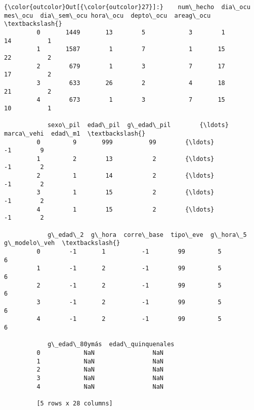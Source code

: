 \documentclass[11pt]{article}
\begin{document}
\begin{Verbatim}[commandchars=\\\{\}]
{\color{outcolor}Out[{\color{outcolor}27}]:}    num\_hecho  dia\_ocu  mes\_ocu  dia\_sem\_ocu hora\_ocu  depto\_ocu  areag\_ocu  \textbackslash{}
         0       1449       13        5            3        1         14          1   
         1       1587        1        7            1       15         22          2   
         2        679        1        3            7       17         17          2   
         3        633       26        2            4       18         21          2   
         4        673        1        3            7       15         10          1   
         
            sexo\_pil  edad\_pil  g\_edad\_pil        {\ldots}          marca\_vehi  edad\_m1  \textbackslash{}
         0         9       999          99        {\ldots}                  -1        9   
         1         2        13           2        {\ldots}                  -1        2   
         2         1        14           2        {\ldots}                  -1        2   
         3         1        15           2        {\ldots}                  -1        2   
         4         1        15           2        {\ldots}                  -1        2   
         
            g\_edad\_2  g\_hora  corre\_base  tipo\_eve  g\_hora\_5 g\_modelo\_veh  \textbackslash{}
         0        -1       1          -1        99         5            6   
         1        -1       2          -1        99         5            6   
         2        -1       2          -1        99         5            6   
         3        -1       2          -1        99         5            6   
         4        -1       2          -1        99         5            6   
         
            g\_edad\_80ymás  edad\_quinquenales  
         0            NaN                NaN  
         1            NaN                NaN  
         2            NaN                NaN  
         3            NaN                NaN  
         4            NaN                NaN  
         
         [5 rows x 28 columns]
\end{Verbatim}
            
\end{document}

